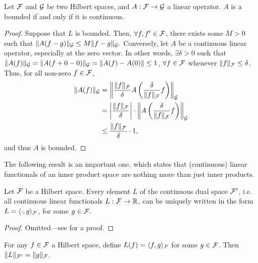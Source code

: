 \begin{lemma}\label{thm:boundcont}
  Let ${\mathcal F}$ and ${\mathcal G}$ be two Hilbert spaces, and $A:{\mathcal F}\to{\mathcal G}$ a linear operator.
  $A$ is a bounded if and only if it is continuous.
\end{lemma}

\begin{proof}
  Suppose that $L$ is bounded.
  Then, $\forall f,f' \in {\mathcal F}$, there exists some $M>0$ such that $\lVert A(f-g)\rVert_{\mathcal G} \leq M \lVert f-g\rVert_{\mathcal G}.$
  Conversely, let $A$ be a continuous linear operator, especially at the zero vector.
  In other words, $\exists \delta > 0$ such that $\lVert A(f)\rVert_{\mathcal G} = \lVert A(f+0-0)\rVert_{\mathcal G} = \lVert A(f) - A(0)\rVert \leq 1$, $\forall f\in{\mathcal F}$ whenever $\lVert f\rVert_{\mathcal F} \leq \delta$.
  Thus, for all non-zero $f \in{\mathcal F}$,
  \begin{align*}
    \lVert A(f)\rVert_{\mathcal G} &= \left\Vert \frac{\lVert f\rVert_{\mathcal F}}{\delta} A\left(\frac{\delta}{\lVert f\rVert_{\mathcal F}}f\right)\right\Vert_{\mathcal G} \\
    &= \left\vert \frac{\lVert f\rVert_{\mathcal F}}{\delta}\right\vert \cdot \left\Vert A\left(\frac{\delta}{\lVert f\rVert_{\mathcal F}}f\right)\right\Vert_{\mathcal G} \\    
    &\leq \frac{\lVert f\rVert_{\mathcal F}}{\delta} \cdot 1,
  \end{align*}
  and thus $A$ is bounded.
\end{proof}

The following result is an important one, which states that (continuous) linear functionals of an inner product space are nothing more than just inner products.

\begin{theorem}
  Let ${\mathcal F}$ be a Hilbert space.
  Every element $L$ of the continuous dual space ${\mathcal F}'$, i.e. all continuous linear functionals $L:{\mathcal F}\to\mathbb{R}$, can be uniquely written in the form $L=\langle\cdot,g\rangle_{\mathcal F}$, for some $g\in{\mathcal F}$.
\end{theorem}

\begin{proof}
  Omitted---see \citet[Theorem 4.12]{rudin1987real} for a proof.
\end{proof}

\begin{corollary}
  For any $f\in{\mathcal F}$ a Hilbert space, define $L(f) = \langle f,g\rangle_{\mathcal F}$ for some $g\in{\mathcal F}$.
  Then $\lVert L\rVert_{{\mathcal F}'} = \lVert g\rVert_{\mathcal F}$. 
\end{corollary}

